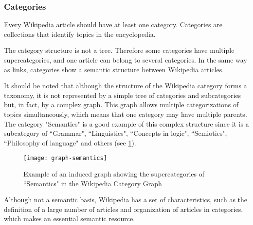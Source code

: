 \subsubsection{\hspace*{3pt} Categories}

Every Wikipedia article should have at least one category. Categories are collections that identify topics in the encyclopedia. 

The category structure is not a tree. Therefore some categories have multiple supercategories, and one article can belong to several categories. In the same way as links, categories show a semantic structure between Wikipedia articles. 

It should be noted that although the structure of the Wikipedia category forms a taxonomy, it is not represented by a simple tree of categories and subcategories but, in fact, by a complex graph. This graph allows multiple categorizations of topics simultaneously, which means that one category may have multiple parents. The category "Semantics" is a good example of this complex structure since it is a subcategory of ``Grammar",  ``Linguistics", ``Concepts in logic", ``Semiotics", ``Philosophy of language" and others (see \ref{fig:semantics-category}).


\begin{figure}[H]
\centering
  \texttt{[image: graph-semantics]}
  \caption{Example of an induced graph showing the supercategories of ``Semantics" in the Wikipedia Category Graph}
  \label{fig:semantics-category}
\end{figure}

Although not a semantic basis, Wikipedia has a set of characteristics, such as the definition of a large number of articles and organization of articles in categories, which makes an essential semantic resource.


